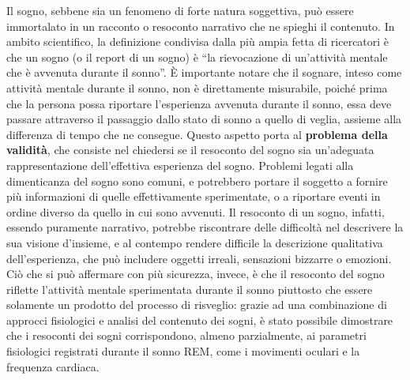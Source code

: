 Il sogno, sebbene sia un fenomeno di forte natura soggettiva, può essere immortalato in un racconto o resoconto
narrativo che ne spieghi il contenuto.
In ambito scientifico, la definizione condivisa dalla più ampia fetta di ricercatori è che un sogno
(o il report di un sogno) è ``la rievocazione di un'attività mentale che è avvenuta durante il sonno''.
\`E importante notare che il sognare, inteso come attività mentale durante il sonno, non è direttamente misurabile,
poiché prima che la persona possa riportare l'esperienza avvenuta durante il sonno, essa
deve passare attraverso il passaggio dallo stato di sonno a quello di veglia, assieme alla differenza di tempo
che ne consegue.
Questo aspetto porta al \textbf{problema della validità}, che consiste nel chiedersi se il resoconto del sogno sia
un'adeguata rappresentazione dell'effettiva esperienza del sogno.
Problemi legati alla dimenticanza del sogno sono comuni, e potrebbero portare il soggetto a fornire più informazioni
di quelle effettivamente sperimentate, o a riportare eventi in ordine diverso da quello in cui sono avvenuti.
Il resoconto di un sogno, infatti, essendo puramente narrativo, potrebbe riscontrare delle difficoltà nel
descrivere la sua visione d'insieme, e al contempo rendere difficile la descrizione qualitativa dell'esperienza,
che può includere oggetti irreali, sensazioni bizzarre o emozioni.
Ciò che si può affermare con più sicurezza, invece, è che il resoconto del sogno riflette l'attività mentale
sperimentata durante il sonno piuttosto che essere solamente un prodotto del processo di risveglio: grazie ad una
combinazione di approcci fisiologici e analisi del contenuto dei sogni, è stato possibile dimostrare che i
resoconti dei sogni corrispondono, almeno parzialmente, ai parametri fisiologici registrati durante il sonno REM, come i
movimenti oculari e la frequenza cardiaca. \newline

